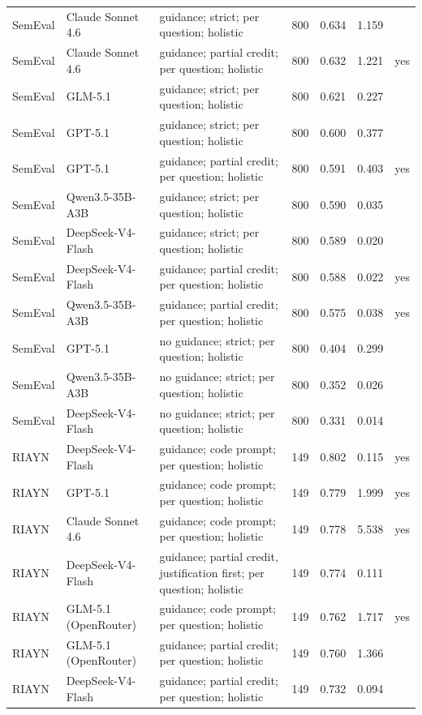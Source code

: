 \documentclass[10pt]{article}
\begin{document}
\begin{longtable}{ll>{\raggedright\arraybackslash}p{5.2cm}rrrc}
SemEval & Claude Sonnet 4.6 & guidance; strict; per question; holistic & 800 & 0.634 & 1.159 &  \\
SemEval & Claude Sonnet 4.6 & guidance; partial credit; per question; holistic & 800 & 0.632 & 1.221 & yes \\
SemEval & GLM-5.1 & guidance; strict; per question; holistic & 800 & 0.621 & 0.227 &  \\
SemEval & GPT-5.1 & guidance; strict; per question; holistic & 800 & 0.600 & 0.377 &  \\
SemEval & GPT-5.1 & guidance; partial credit; per question; holistic & 800 & 0.591 & 0.403 & yes \\
SemEval & Qwen3.5-35B-A3B & guidance; strict; per question; holistic & 800 & 0.590 & 0.035 &  \\
SemEval & DeepSeek-V4-Flash & guidance; strict; per question; holistic & 800 & 0.589 & 0.020 &  \\
SemEval & DeepSeek-V4-Flash & guidance; partial credit; per question; holistic & 800 & 0.588 & 0.022 & yes \\
SemEval & Qwen3.5-35B-A3B & guidance; partial credit; per question; holistic & 800 & 0.575 & 0.038 & yes \\
SemEval & GPT-5.1 & no guidance; strict; per question; holistic & 800 & 0.404 & 0.299 &  \\
SemEval & Qwen3.5-35B-A3B & no guidance; strict; per question; holistic & 800 & 0.352 & 0.026 &  \\
SemEval & DeepSeek-V4-Flash & no guidance; strict; per question; holistic & 800 & 0.331 & 0.014 &  \\
RIAYN & DeepSeek-V4-Flash & guidance; code prompt; per question; holistic & 149 & 0.802 & 0.115 & yes \\
RIAYN & GPT-5.1 & guidance; code prompt; per question; holistic & 149 & 0.779 & 1.999 & yes \\
RIAYN & Claude Sonnet 4.6 & guidance; code prompt; per question; holistic & 149 & 0.778 & 5.538 & yes \\
RIAYN & DeepSeek-V4-Flash & guidance; partial credit, justification first; per question; holistic & 149 & 0.774 & 0.111 &  \\
RIAYN & GLM-5.1 (OpenRouter) & guidance; code prompt; per question; holistic & 149 & 0.762 & 1.717 & yes \\
RIAYN & GLM-5.1 (OpenRouter) & guidance; partial credit; per question; holistic & 149 & 0.760 & 1.366 &  \\
RIAYN & DeepSeek-V4-Flash & guidance; partial credit; per question; holistic & 149 & 0.732 & 0.094 &  \\

\end{longtable}
\end{document}
